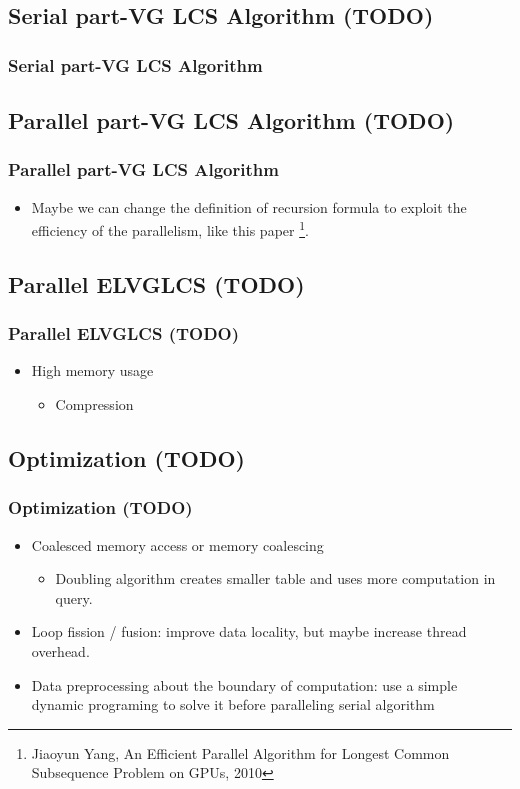\subsection{Serial part-VG LCS Algorithm (TODO)}
\begin{frame}
	\frametitle{Serial part-VG LCS Algorithm}
\end{frame}

\subsection{Parallel part-VG LCS Algorithm (TODO)}
\begin{frame}
	\frametitle{Parallel part-VG LCS Algorithm}
	\begin{itemize}
		\item Maybe we can change the definition of recursion formula to exploit the efficiency of the parallelism, like this paper
		\footnote{Jiaoyun Yang, An Efficient Parallel Algorithm for Longest Common Subsequence Problem on GPUs, 2010}.
	\end{itemize}
\end{frame}

\subsection{Parallel ELVGLCS (TODO)}
\begin{frame}
	\frametitle{Parallel ELVGLCS (TODO)}
	\begin{itemize}
		\item High memory usage 
			\begin{itemize}
				\item Compression
			\end{itemize}
	\end{itemize}
\end{frame}

\subsection{Optimization (TODO)}
\begin{frame}
	\frametitle{Optimization (TODO)}
	\begin{itemize}
		\setlength\itemsep{1em}
		\item Coalesced memory access or memory coalescing
			\begin{itemize}
				\item Doubling algorithm creates smaller table
					and uses more computation in query.
			\end{itemize}
		\item Loop fission / fusion: improve data locality, 
			but maybe increase thread overhead.
		\item Data preprocessing about the boundary of computation: use a simple dynamic programing to solve it before paralleling serial algorithm
	\end{itemize}
\end{frame}